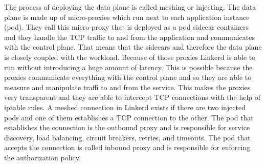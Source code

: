 The process of deploying the data plane is called meshing or injecting.
The data plane is made up of micro-proxies which run next to each application instance (pod).
They call this micro-proxy that is deployed as a pod sidecar containers and they handle the TCP traffic to and from the application and communicates with the control plane. 
That means that the sidecars and therefore the data plane is closely coupled with the workload.
Because of those proxies Linkerd is able to run without introducing a huge amount of latency.
This is possible because the proxies communicate everything with the control plane and so they are able to measure and manipulate traffi to and from the service.
This makes the proxies very transparent and they are able to intercept TCP connections with the help of iptable rules.
A meshed connection in Linkerd exists if there are two injected pods and one of them establishes a TCP connection to the other.
The pod that establishes the connection is the outbound proxy and is responsible for service discovery, load balancing, circuit breakers, retries, and timeouts. The pod that accepts the connection is called inbound proxy and is responsible for enforcing the authorization policy.